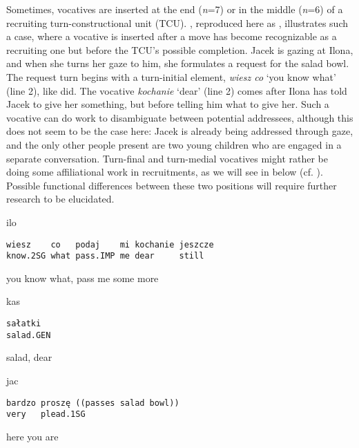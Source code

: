 \documentclass[output=paper]{langsci/langscibook}
\begin{document}
Sometimes, vocatives are inserted at the end (\textit{n}=7) or in the middle (\textit{n}=6) of a recruiting turn-constructional unit (TCU).  , reproduced here as , illustrates such a case, where a vocative is inserted after a move has become recognizable as a recruiting one but before the TCU’s possible completion.  Jacek is gazing at Ilona, and when she turns her gaze to him, she formulates a request for the salad bowl.  The request turn begins with a turn-initial element, \textit{wiesz co} `you know what' (line 2), like  did.  The vocative \textit{kochanie} `dear' (line 2) comes after Ilona has told Jacek to give her something, but before telling him what to give her.  Such a vocative can do work to disambiguate between potential addressees, although this does not seem to be the case here: Jacek is already being addressed through gaze, and the only other people present are two young children who are engaged in a separate conversation.  Turn-final and turn-medial vocatives might rather be doing some affiliational work in recruitments, as we will see in  below (cf. \citealt{Lerner2003}). Possible functional differences between these two positions will require further research to be elucidated.

\vspace{2mm}
%
%
\begin{mdframednoverticalspace}[style=firstfoc]
\begin{transbox}{2}{ilo}
\begin{verbatim}
wiesz    co   podaj    mi kochanie jeszcze
know.2SG what pass.IMP me dear     still
\end{verbatim}
you know what, pass me some more
\end{transbox}
\end{mdframednoverticalspace}
%
\begin{transbox}{3}{kas}
\begin{verbatim}
sałatki
salad.GEN
\end{verbatim}
salad, dear
\end{transbox}
%
\begin{mdframednoverticalspace}[style=secondfoc]
\begin{transbox}{4}{jac}
\begin{verbatim}
bardzo proszę ((passes salad bowl))
very   plead.1SG
\end{verbatim}
here you are
\end{transbox}
\end{mdframednoverticalspace}
\end{document}
